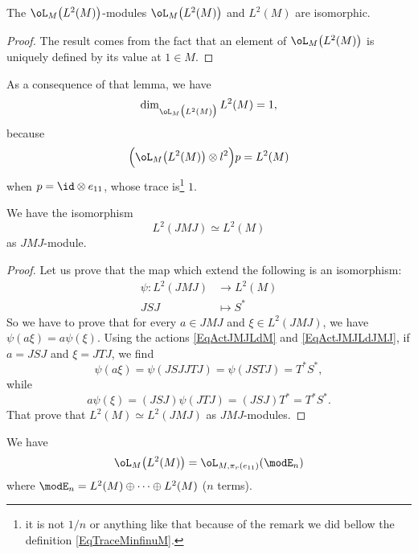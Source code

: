 \begin{lemma}
	The $\oL_M\big( L^2(M) \big)$-modules $\oL_M\big(L^2(M)\big)$ and $L^2(M)$ are isomorphic.
\end{lemma}

\begin{proof}
	The result comes from the fact that an element of $\oL_M\big(L^2(M)\big)$ is uniquely defined by its value at $1\in M$.
\end{proof}
As a consequence of that lemma, we have
\begin{equation}
	\dim_{\oL_M\big( L^2(M) \big)}L^2(M)=1,
\end{equation}
because
\begin{equation}
	\Big( \oL_M\big( L^2(M) \big)\otimes l^2 \Big)p=L^2(M)
\end{equation}
when $p=\id\otimes e_{11}$, whose trace is\footnote{it is not $1/n$ or anything like that because of the remark we did bellow the definition \eqref{EqTraceMinfinuM}.} $1$.

\begin{lemma}		\label{LemLJMJequalLM}
	We have the isomorphism
	\begin{equation}
		L^2(JMJ)\simeq L^2(M)
	\end{equation}
as $JMJ$-module.
\end{lemma}

\begin{proof}
	Let us prove that the map which extend the following is an isomorphism:
	\begin{equation}
		\begin{aligned}
		 \psi\colon L^2(JMJ)&\to L^2(M) \\ 
		   JSJ&\mapsto S^* 
		\end{aligned}
	\end{equation}
	So we have to prove that for every $a\in JMJ$ and $\xi\in L^2(JMJ)$, we have $\psi(a\xi)=a\psi(\xi)$. Using the actions \eqref{EqActJMJLdM} and \eqref{EqActJMJLdJMJ}, if $a=JSJ$ and $\xi=JTJ$, we find
	\begin{equation}
		\psi(a\xi)=\psi(JSJJTJ)=\psi(JSTJ)=T^*S^*, 
	\end{equation}
	while
	\begin{equation}
		a\psi(\xi)=(JSJ)\psi(JTJ)=(JSJ)T^*=T^*S^*.
	\end{equation}
	That prove that $L^2(M)\simeq L^2(JMJ)$ as $JMJ$-modules.
\end{proof}

\begin{lemma}
	We have
	\begin{equation}		\label{EqoLLdpireununmodE}
		\oL_M\big( L^2(M) \big)=\oL_{M,\pi_r(e_{11})}(\modE_n)
	\end{equation}
	where $\modE_n=L^2(M)\oplus \cdots\oplus L^2(M)$ ($n$ terms).
\end{lemma}


